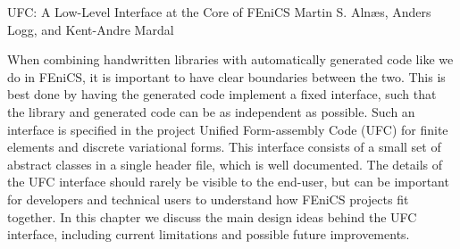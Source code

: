               {UFC: A Low-Level Interface at the Core of FEniCS}
              {Martin S. Aln\ae{}s, Anders Logg, and Kent-Andre Mardal}

\editornote{[alnes-2]}

When combining handwritten libraries with automatically generated
code like we do in FEniCS, it is important to have clear boundaries
between the two.  This is best done by having the generated code
implement a fixed interface, such that the library and generated code
can be as independent as possible.  Such an interface is specified in
the project Unified Form-assembly Code (UFC) for finite elements and
discrete variational forms. This interface consists of a small set of
abstract classes in a single header file, which is well documented.
The details of the UFC interface should rarely be visible to the
end-user, but can be important for developers and technical users to
understand how FEniCS projects fit together. In this chapter we
discuss the main design ideas behind the UFC interface, including
current limitations and possible future improvements.
